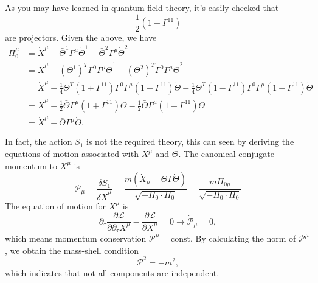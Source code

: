 \documentclass[graybox,envcountchap,sectrefs]{svmono}
\begin{document}
As you may have learned in quantum field theory, it's easily checked that
\begin{equation}
\frac{1}{2}(1\pm\Gamma^{11})	
\end{equation}
are projectors.
Given the above, we have
\begin{equation}
	\begin{aligned}
\Pi_{0}^{\mu} &=\dot{X}^{\mu}-\bar{\Theta}^{1} \Gamma^{\mu} \dot{\Theta}^{1}-\bar{\Theta}^{2} \Gamma^{\mu} \dot{\Theta}^{2} \\
&=\dot{X}^{\mu}-\left(\Theta^{1}\right)^{T} \Gamma^{0} \Gamma^{\mu} \dot{\Theta}^{1}-\left(\Theta^{2}\right)^{T} \Gamma^{0} \Gamma^{\mu} \dot{\Theta}^{2} \\
&=\dot{X}^{\mu}-\frac{1}{4} \Theta^{T}\left(1+\Gamma^{11}\right) \Gamma^{0} \Gamma^{\mu}\left(1+\Gamma^{11}\right) \dot{\Theta}-\frac{1}{4} \Theta^{T}\left(1-\Gamma^{11}\right) \Gamma^{0} \Gamma^{\mu}\left(1-\Gamma^{11}\right) \dot{\Theta} \\
&=\dot{X}^{\mu}-\frac{1}{2} \bar{\Theta} \Gamma^{\mu}\left(1+\Gamma^{11}\right) \dot{\Theta}-\frac{1}{2} \bar{\Theta} \Gamma^{\mu}\left(1-\Gamma^{11}\right) \dot{\Theta} \\
&=\dot{X}^{\mu}-\bar{\Theta} \Gamma^{\mu} \dot{\Theta}.
\end{aligned}
\end{equation}


In fact, the action $S_1$ is not the required theory, this can seen by deriving the equations of motion associated with $X^{\mu}$ and $\Theta$.
The canonical conjugate momentum to $X^{\mu}$ is
\begin{equation}
\mathcal{P}_{\mu}=\frac{\delta S_{1}}{\delta \dot{X}^{\mu}}=\frac{m\left(\dot{X}_{\mu}-\bar{\Theta} \Gamma \dot{\Theta}\right)}{\sqrt{-\Pi_{0} \cdot \Pi_{0}}}=\frac{m \Pi_{0 \mu}}{\sqrt{-\Pi_{0} \cdot \Pi_{0}}}	
\end{equation}
The equation of motion for $X^{\mu}$ is
\begin{equation}
	\partial_{\tau} \frac{\partial \mathcal{L}}{\partial \partial_{\tau} X^{\mu}}-\frac{\partial \mathcal{L}}{\partial X^{\mu}}=0 \rightarrow \dot{\mathcal{P}}_{\mu}=0,
\end{equation}
which means momentum conservation
$\mathcal{P}^{\mu}=\mathrm{const}$.
By calculating the norm of $\mathcal{P}^{\mu}$, we obtain the mass-shell condition
\begin{equation}
\mathcal{P}^2=-m^2,
\end{equation}
which indicates that not all components are independent.
\end{document}
